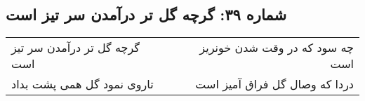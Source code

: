 \begin{center}
\section*{شماره ۳۹: گرچه گل تر درآمدن سر تیز است}
\label{sec:039}
\begin{longtable}{l p{0.5cm} r}
گرچه گل تر درآمدن سر تیز است
&&
چه سود که در وقت شدن خونریز است
\\
تاروی نمود گل همی پشت بداد
&&
دردا که وصال گل فراق آمیز است
\\
\end{longtable}
\end{center}
